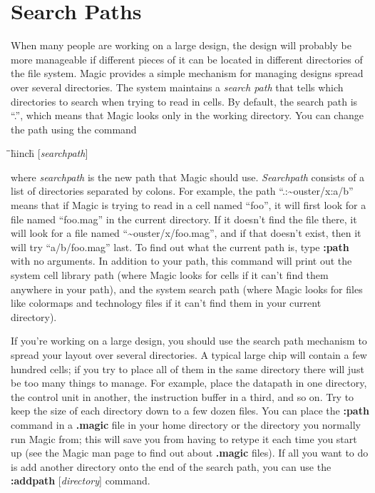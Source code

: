 \documentclass[letterpaper,twoside,12pt]{article}
\def\hinch{\hspace*{0.5in}}
\def\starti{\begin{center}\begin{tabbing}\hinch\=\hinch\=\hinch\=hinch\hinch\=\kill}
\def\endi{\end{tabbing}\end{center}}
\def\ii{\>\>\>}
\begin{document}
\section{Search Paths}

When many people are working on a large design, the design
will probably be more manageable if different pieces of it
can be located in different directories of the file system.
Magic provides a simple mechanism for managing designs spread
over several directories.  The system maintains a {\itshape search path}
that tells which directories to search when trying to read in
cells.  By default, the search path is ``.'', which means that
Magic looks only in the working directory.  You can change the
path using the command

\starti
  \ii {\bfseries :path }[{\itshape searchpath}]
\endi

where {\itshape searchpath} is the new path that Magic should use.
{\itshape Searchpath} consists of a list of directories separated
by colons.  For example, the path ``.:\~{}ouster/x:a/b'' means
that if Magic is trying to read in a cell named ``foo'', it
will first look for a file named ``foo.mag'' in the current directory.
If it doesn't find the file there, it will look for a file named
``\~{}ouster/x/foo.mag'', and if that doesn't exist, then it will try
``a/b/foo.mag'' last.  To find out what the current path is, type
{\bfseries :path} with no arguments.  In addition to your path, this command
will print out the system cell library path (where Magic looks for
cells if it can't find them anywhere in your path), and the system
search path (where Magic looks for files like colormaps and technology
files if it can't find them in your current directory).

If you're working on a large design, you should use the search
path mechanism to spread your layout over several directories.
A typical large chip will contain a few hundred cells;  if you
try to place all of them in the same directory there will just
be too many things to manage.  For example, place the datapath in one
directory, the control unit in another, the instruction buffer in
a third, and so on.  Try to keep the size of each directory down
to a few dozen files.  You can place the {\bfseries :path} command in
a {\bfseries .magic} file in your home directory or the directory you
normally run Magic from;  this will save you from having to
retype it each time you start up (see the Magic man page to
find out about {\bfseries .magic} files).
If all you want to do is add another directory onto the end of the search 
path, you can use the {\bfseries :addpath }[{\itshape directory}] command.  
\end{document}
